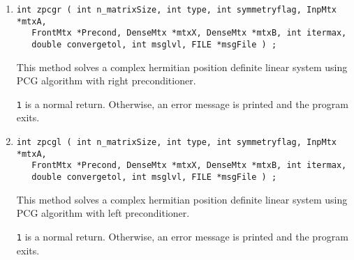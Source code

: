 \begin{enumerate}
\item
\begin{verbatim}
int zpcgr ( int n_matrixSize, int type, int symmetryflag, InpMtx *mtxA,
   FrontMtx *Precond, DenseMtx *mtxX, DenseMtx *mtxB, int itermax,
   double convergetol, int msglvl, FILE *msgFile ) ;
\end{verbatim}
\par
This method solves a complex hermitian position definite linear 
system using PCG algorithm with right preconditioner. 
\par {}
{\tt 1} is a normal return.  Otherwise, an error message is printed and 
the program exits.

\item
\begin{verbatim}
int zpcgl ( int n_matrixSize, int type, int symmetryflag, InpMtx *mtxA,
   FrontMtx *Precond, DenseMtx *mtxX, DenseMtx *mtxB, int itermax,
   double convergetol, int msglvl, FILE *msgFile ) ;
\end{verbatim}
\par
This method solves a complex hermitian position definite linear system 
using PCG algorithm with left preconditioner. 
\par {}
{\tt 1} is a normal return.  Otherwise, an error message is printed and 
the program exits.

\end{enumerate}


